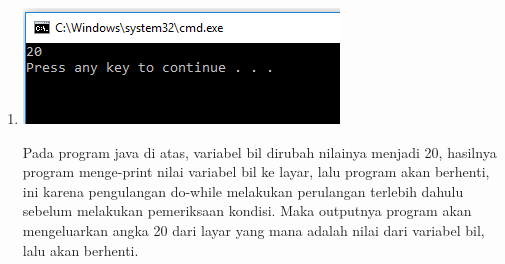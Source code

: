 \documentclass[a4paper,12pt]{article}
\begin{document}
\begin{enumerate}
\item \begin{minipage}[t]{\linewidth}
	\raggedright
	\begin{center}
		\includegraphics[scale=1]{Capture2_2}
	\end{center}
	
	
\end{minipage}
Pada program java di atas, variabel bil dirubah nilainya menjadi 20, hasilnya program  menge-print nilai variabel bil ke layar, lalu program akan berhenti, ini karena pengulangan do-while melakukan perulangan terlebih dahulu sebelum melakukan pemeriksaan kondisi. Maka outputnya program akan mengeluarkan angka 20 dari layar yang mana adalah nilai dari variabel bil, lalu akan berhenti.

\end{enumerate}
\end{document}
